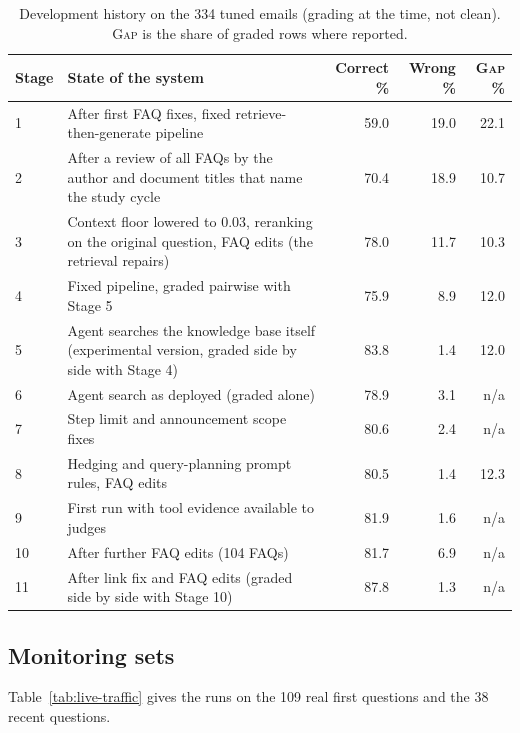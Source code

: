\begin{table}[htbp]
\centering
\caption[Development history on the 334 tuned emails (grading at the time, not clean)]{Development history on the 334 tuned emails (grading at the time, not clean). \textsc{Gap} is the share of graded rows where reported.}
\label{tab:live-history}
\small
\begin{tabularx}{\linewidth}{@{}l>{\raggedright\arraybackslash}Xrrr@{}}
\toprule
Stage & State of the system & Correct \% & Wrong \% & \textsc{Gap} \% \\
\midrule
1 & After first FAQ fixes, fixed retrieve-then-generate pipeline & 59.0 & 19.0 & 22.1 \\
2 & After a review of all FAQs by the author and document titles that name the study cycle & 70.4 & 18.9 & 10.7 \\
3 & Context floor lowered to 0.03, reranking on the original question, FAQ edits (the retrieval repairs) & 78.0 & 11.7 & 10.3 \\
4 & Fixed pipeline, graded pairwise with Stage 5 & 75.9 & 8.9 & 12.0 \\
5 & Agent searches the knowledge base itself (experimental version, graded side by side with Stage 4) & 83.8 & 1.4 & 12.0 \\
6 & Agent search as deployed (graded alone) & 78.9 & 3.1 & n/a \\
7 & Step limit and announcement scope fixes & 80.6 & 2.4 & n/a \\
8 & Hedging and query-planning prompt rules, FAQ edits & 80.5 & 1.4 & 12.3 \\
9 & First run with tool evidence available to judges & 81.9 & 1.6 & n/a \\
10 & After further FAQ edits (104 FAQs) & 81.7 & 6.9 & n/a \\
11 & After link fix and FAQ edits (graded side by side with Stage 10) & 87.8 & 1.3 & n/a \\
\bottomrule
\end{tabularx}
\end{table}

\subsection{Monitoring sets}
\label{app:live-traffic}

Table~\ref{tab:live-traffic} gives the runs on the 109 real first questions and the 38 recent questions.

